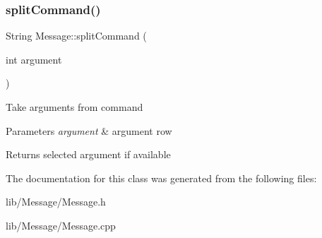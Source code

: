 \subsubsection{\texorpdfstring{split\+Command()}{splitCommand()}}
{\footnotesize\ttfamily String Message\+::split\+Command (\begin{DoxyParamCaption}\item[{int}]{argument }\end{DoxyParamCaption})}

Take arguments from command 
\begin{DoxyParams}{Parameters}
{\em argument} & argument row \\
\hline
\end{DoxyParams}
\begin{DoxyReturn}{Returns}
selected argument if available 
\end{DoxyReturn}


The documentation for this class was generated from the following files\+:\begin{DoxyCompactItemize}
\item 
lib/\+Message/Message.\+h\item 
lib/\+Message/Message.\+cpp\end{DoxyCompactItemize}
